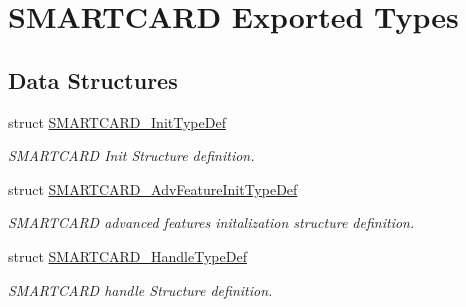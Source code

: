 \hypertarget{group___s_m_a_r_t_c_a_r_d___exported___types}{}\section{S\+M\+A\+R\+T\+C\+A\+RD Exported Types}
\label{group___s_m_a_r_t_c_a_r_d___exported___types}
\subsection*{Data Structures}
\begin{DoxyCompactItemize}
\item 
struct \hyperlink{struct_s_m_a_r_t_c_a_r_d___init_type_def}{S\+M\+A\+R\+T\+C\+A\+R\+D\+\_\+\+Init\+Type\+Def}
\begin{DoxyCompactList}\small\item\em S\+M\+A\+R\+T\+C\+A\+RD Init Structure definition. \end{DoxyCompactList}\item 
struct \hyperlink{struct_s_m_a_r_t_c_a_r_d___adv_feature_init_type_def}{S\+M\+A\+R\+T\+C\+A\+R\+D\+\_\+\+Adv\+Feature\+Init\+Type\+Def}
\begin{DoxyCompactList}\small\item\em S\+M\+A\+R\+T\+C\+A\+RD advanced features initalization structure definition. \end{DoxyCompactList}\item 
struct \hyperlink{struct_s_m_a_r_t_c_a_r_d___handle_type_def}{S\+M\+A\+R\+T\+C\+A\+R\+D\+\_\+\+Handle\+Type\+Def}
\begin{DoxyCompactList}\small\item\em S\+M\+A\+R\+T\+C\+A\+RD handle Structure definition. \end{DoxyCompactList}\end{DoxyCompactItemize}
